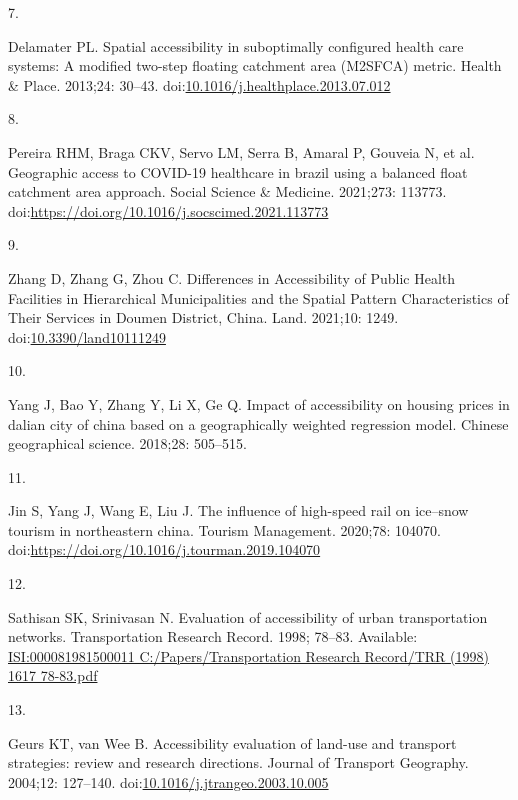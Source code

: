 \documentclass[10pt,letterpaper]{article}
\newlength{\cslhangindent}
\newlength{\csllabelwidth}
\newlength{\cslentryspacingunit} %
\newenvironment{CSLReferences}[2] %
 {%
  \setlength{\parindent}{0pt}
  \ifodd #1
  \let\oldpar\par
  \def\par{\hangindent=\cslhangindent\oldpar}
  \fi
  \setlength{\parskip}{#2\cslentryspacingunit}
 }%
 {}
\newcommand{\CSLLeftMargin}[1]{\parbox[t]{\csllabelwidth}{#1}}
\newcommand{\CSLRightInline}[1]{\parbox[t]{\linewidth - \csllabelwidth}{#1}\break}
\begin{document}
\begin{CSLReferences}{0}{0}
\leavevmode{}%
\CSLLeftMargin{7. }%
\CSLRightInline{Delamater PL. Spatial accessibility in suboptimally
configured health care systems: A modified two-step floating catchment
area (M2SFCA) metric. Health \& Place. 2013;24: 30--43.
doi:\href{https://doi.org/10.1016/j.healthplace.2013.07.012}{10.1016/j.healthplace.2013.07.012}}

\leavevmode{}%
\CSLLeftMargin{8. }%
\CSLRightInline{Pereira RHM, Braga CKV, Servo LM, Serra B, Amaral P,
Gouveia N, et al. Geographic access to COVID-19 healthcare in brazil
using a balanced float catchment area approach. Social Science \&
Medicine. 2021;273: 113773.
doi:\url{https://doi.org/10.1016/j.socscimed.2021.113773}}

\leavevmode{}%
\CSLLeftMargin{9. }%
\CSLRightInline{Zhang D, Zhang G, Zhou C. Differences in {Accessibility}
of {Public Health Facilities} in {Hierarchical Municipalities} and the
{Spatial Pattern Characteristics} of {Their Services} in {Doumen
District}, {China}. Land. 2021;10: 1249.
doi:\href{https://doi.org/10.3390/land10111249}{10.3390/land10111249}}

\leavevmode{}%
\CSLLeftMargin{10. }%
\CSLRightInline{Yang J, Bao Y, Zhang Y, Li X, Ge Q. Impact of
accessibility on housing prices in dalian city of china based on a
geographically weighted regression model. Chinese geographical science.
2018;28: 505--515. }

\leavevmode{}%
\CSLLeftMargin{11. }%
\CSLRightInline{Jin S, Yang J, Wang E, Liu J. The influence of
high-speed rail on ice--snow tourism in northeastern china. Tourism
Management. 2020;78: 104070.
doi:\url{https://doi.org/10.1016/j.tourman.2019.104070}}

\leavevmode{}%
\CSLLeftMargin{12. }%
\CSLRightInline{Sathisan SK, Srinivasan N. Evaluation of accessibility
of urban transportation networks. Transportation Research Record. 1998;
78--83. Available:
\href{https://ISI:000081981500011\%0AC:/Papers/Transportation\%20Research\%20Record/TRR\%20(1998)\%201617\%2078-83.pdf}{ISI:000081981500011
C:/Papers/Transportation Research Record/TRR (1998) 1617 78-83.pdf}}

\leavevmode{}%
\CSLLeftMargin{13. }%
\CSLRightInline{Geurs KT, van Wee B. Accessibility evaluation of
land-use and transport strategies: review and research directions.
Journal of Transport Geography. 2004;12: 127--140.
doi:\href{https://doi.org/10.1016/j.jtrangeo.2003.10.005}{10.1016/j.jtrangeo.2003.10.005}}


\end{CSLReferences}
\end{document}
